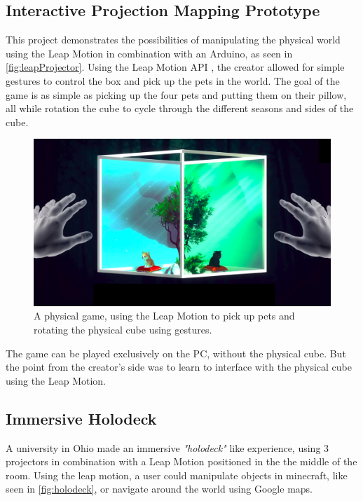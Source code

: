 \subsection{Interactive Projection Mapping Prototype} %
    This project demonstrates the possibilities of manipulating the physical world using the Leap Motion in combination with an Arduino, as seen in \autoref{fig:leapProjector}. Using the Leap Motion API , the creator allowed for simple gestures to control the box and pick up the pets in the world. The goal of the game is as simple as picking up the four pets and putting them on their pillow, all while rotation the cube to cycle through the different seasons and sides of the cube\cite{leapMotionProjectionMapping}.
    \begin{figure}[H]
    	\centering
    	\includegraphics[width=0.8\linewidth]{figure/Analysis/LeapProjector.png}
    	\caption{A physical game, using the Leap Motion to pick up pets and rotating the physical cube using gestures\cite{leapMotionProjectionMapping}.}
    	\label{fig:leapProjector}
    \end{figure}
    The game can be played exclusively on the PC, without the physical cube. But the point from the creator's side was to learn to interface with the physical cube using the Leap Motion.
\subsection{Immersive Holodeck}\label{sec:leapMotionHolodeck} %
    A university in Ohio made an immersive \textit{"holodeck"} like experience, using 3 projectors in combination with a Leap Motion positioned in the the middle of the room. Using the leap motion, a user could manipulate objects in minecraft, like seen in \autoref{fig:holodeck}, or navigate around the world using Google maps\cite{leapMotionHolodeck}.
    
